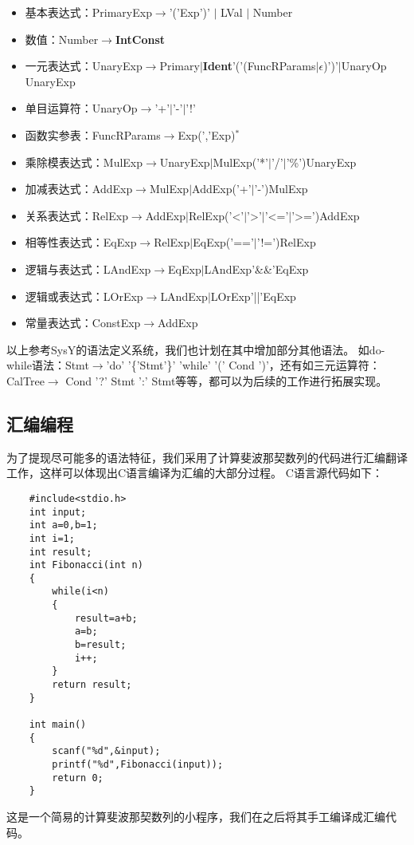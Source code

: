 \documentclass[UTF8]{ctexart}
\begin{document}
\begin{itemize}
        \item 基本表达式：PrimaryExp$\rightarrow$'('Exp')' $\mid$ LVal $\mid$ Number
        \item 数值：Number$\rightarrow${\bf{IntConst}}
        \item 一元表达式：UnaryExp$\rightarrow$Primary$\mid${\bf{Ident}}'('(FuncRParams$\mid \epsilon$)')'$\mid$UnaryOp UnaryExp
        \item 单目运算符：UnaryOp$\rightarrow$'+'$\mid$'-'$\mid$'!'
        \item 函数实参表：FuncRParams$\rightarrow$Exp(','Exp)$^*$
        \item 乘除模表达式：MulExp$\rightarrow$UnaryExp$\mid$MulExp('*'$\mid$'/'$\mid$'\%')UnaryExp
        \item 加减表达式：AddExp$\rightarrow$MulExp$\mid$AddExp('+'$\mid$'-')MulExp
        \item 关系表达式：RelExp$\rightarrow$AddExp$\mid$RelExp('<'$\mid$'>'$\mid$'<='$\mid$'>=')AddExp
        \item 相等性表达式：EqExp$\rightarrow$RelExp$\mid$EqExp('=='$\mid$'!=')RelExp
        \item 逻辑与表达式：LAndExp$\rightarrow$EqExp$\mid$LAndExp'\&\&'EqExp
        \item 逻辑或表达式：LOrExp$\rightarrow$LAndExp$\mid$LOrExp'||'EqExp
        \item 常量表达式：ConstExp$\rightarrow$AddExp
    \end{itemize}
    以上参考SysY的语法定义系统，我们也计划在其中增加部分其他语法。
    如do-while语法：Stmt$\rightarrow$'do' '\{'Stmt'\}' 'while' '(' Cond ')'，还有如三元运算符：
    CalTree$\rightarrow$ Cond '?' Stmt ':' Stmt等等，都可以为后续的工作进行拓展实现。
\subsection{汇编编程}
为了提现尽可能多的语法特征，我们采用了计算斐波那契数列的代码进行汇编翻译工作，这样可以体现出C语言编译为汇编的大部分过程。
C语言源代码如下：
\begin{lstlisting}
    #include<stdio.h>
    int input;
    int a=0,b=1;
    int i=1;
    int result;
    int Fibonacci(int n)
    {
        while(i<n)
        {
            result=a+b;
            a=b;
            b=result;
            i++;
        }
        return result;
    }
    
    int main()
    {
        scanf("%d",&input);
        printf("%d",Fibonacci(input));
        return 0;
    }
\end{lstlisting}
这是一个简易的计算斐波那契数列的小程序，我们在之后将其手工编译成汇编代码。
\end{document}
